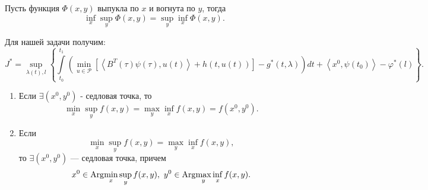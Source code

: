 \begin{theorem} Пусть функция $\Phi(x,y)$ выпукла по $x$ и вогнута по $y$, тогда 
\begin{equation*} \inf_{x}\sup_{y}\Phi(x,y)=\sup_{y}\inf_{x}\Phi(x,y). \end{equation*}
\end{theorem}

Для нашей задачи получим:
\begin{equation*}
J^*=\sup_{\lambda(t),l}\left\lbrace  \int\limits_{t_0}^{t_1}\left(\min_{u\in \mathcal{P} }\left[\left< B^{T}(\tau)\psi(\tau),u(t) \right>  +h(t,u(t)) \right] -g^*(t,\lambda)\right)dt  + \left<x^0,\psi(t_0) \right> - \varphi^*(l) \right\rbrace.
\end{equation*}

\begin{theorem}\begin{enumerate}
		\item Если $ \exists (x^0,y^0) $ - седловая точка, то \begin{equation*}\min_{x}\sup_{y}f(x,y)=\max_{y}\inf_{x}f(x,y)=f(x^0,y^0).\end{equation*}
		\item Если
		\begin{equation*} \min_{x} \sup_{y} f(x,y)= \max_{y} \inf_{x} f(x,y), 
		\end{equation*} то $ \exists (x^0,y^0) $ --- седловая точка, причем 
		\begin{equation*}x^0 \in \operatorname{Arg}\!\min_{x}\sup_{y}f(x,y) ,~  y^0\in \operatorname{Arg}\!\max_{y}\inf_{x}f(x,y). \end{equation*}
	 \end{enumerate}
\end{theorem}
